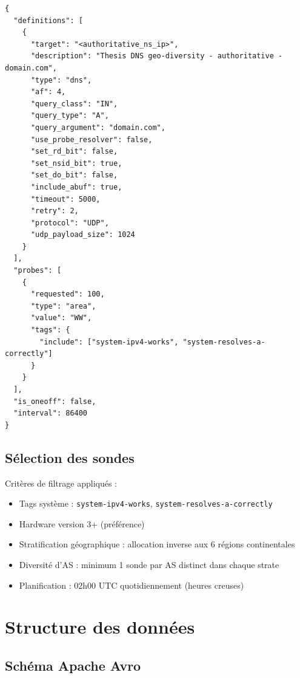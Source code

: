 \documentclass[a4paper,11pt]{book}
\begin{document}
\begin{lstlisting}[style=json,caption=Configuration JSON d'une mesure DNS RIPE Atlas]
{
  "definitions": [
    {
      "target": "<authoritative_ns_ip>",
      "description": "Thesis DNS geo-diversity - authoritative - domain.com",
      "type": "dns",
      "af": 4,
      "query_class": "IN",
      "query_type": "A",
      "query_argument": "domain.com",
      "use_probe_resolver": false,
      "set_rd_bit": false,
      "set_nsid_bit": true,
      "set_do_bit": false,
      "include_abuf": true,
      "timeout": 5000,
      "retry": 2,
      "protocol": "UDP",
      "udp_payload_size": 1024
    }
  ],
  "probes": [
    {
      "requested": 100,
      "type": "area",
      "value": "WW",
      "tags": {
        "include": ["system-ipv4-works", "system-resolves-a-correctly"]
      }
    }
  ],
  "is_oneoff": false,
  "interval": 86400
}
\end{lstlisting}

\section{Sélection des sondes}

Critères de filtrage appliqués :
\begin{itemize}
    \item Tags système : \texttt{system-ipv4-works}, \texttt{system-resolves-a-correctly}
    \item Hardware version 3+ (préférence)
    \item Stratification géographique : allocation inverse aux 6 régions continentales
    \item Diversité d'AS : minimum 1 sonde par AS distinct dans chaque strate
    \item Planification : 02h00 UTC quotidiennement (heures creuses)
\end{itemize}

\chapter{Structure des données}

\section{Schéma Apache Avro}
\end{document}
